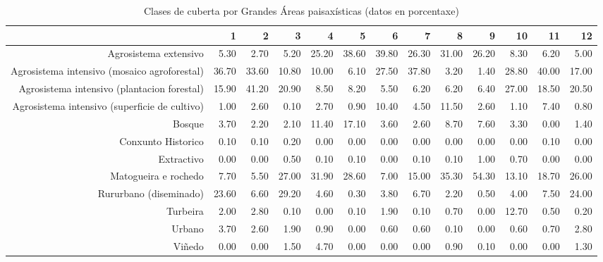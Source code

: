 \begin{table}[p]
\centering
\caption{Clases de cuberta por Grandes Áreas paisaxísticas (datos en porcentaxe)} 
\label{xtaboa2p}
\begin{tabular}{rrrrrrrrrrrrr}
  \hline
 & 1 & 2 & 3 & 4 & 5 & 6 & 7 & 8 & 9 & 10 & 11 & 12 \\ 
  \hline
Agrosistema extensivo & 5.30 & 2.70 & 5.20 & 25.20 & 38.60 & 39.80 & 26.30 & 31.00 & 26.20 & 8.30 & 6.20 & 5.00 \\ 
  Agrosistema intensivo (mosaico agroforestal) & 36.70 & 33.60 & 10.80 & 10.00 & 6.10 & 27.50 & 37.80 & 3.20 & 1.40 & 28.80 & 40.00 & 17.00 \\ 
  Agrosistema intensivo (plantacion forestal) & 15.90 & 41.20 & 20.90 & 8.50 & 8.20 & 5.50 & 6.20 & 6.20 & 6.40 & 27.00 & 18.50 & 20.50 \\ 
  Agrosistema intensivo (superficie de cultivo) & 1.00 & 2.60 & 0.10 & 2.70 & 0.90 & 10.40 & 4.50 & 11.50 & 2.60 & 1.10 & 7.40 & 0.80 \\ 
  Bosque & 3.70 & 2.20 & 2.10 & 11.40 & 17.10 & 3.60 & 2.60 & 8.70 & 7.60 & 3.30 & 0.00 & 1.40 \\ 
  Conxunto Historico & 0.10 & 0.10 & 0.20 & 0.00 & 0.00 & 0.00 & 0.00 & 0.00 & 0.00 & 0.00 & 0.10 & 0.00 \\ 
  Extractivo & 0.00 & 0.00 & 0.50 & 0.10 & 0.10 & 0.00 & 0.10 & 0.10 & 1.00 & 0.70 & 0.00 & 0.00 \\ 
  Matogueira e rochedo & 7.70 & 5.50 & 27.00 & 31.90 & 28.60 & 7.00 & 15.00 & 35.30 & 54.30 & 13.10 & 18.70 & 26.00 \\ 
  Rururbano (diseminado) & 23.60 & 6.60 & 29.20 & 4.60 & 0.30 & 3.80 & 6.70 & 2.20 & 0.50 & 4.00 & 7.50 & 24.00 \\ 
  Turbeira & 2.00 & 2.80 & 0.10 & 0.00 & 0.10 & 1.90 & 0.10 & 0.70 & 0.00 & 12.70 & 0.50 & 0.20 \\ 
  Urbano & 3.70 & 2.60 & 1.90 & 0.90 & 0.00 & 0.60 & 0.60 & 0.10 & 0.00 & 0.60 & 0.70 & 2.80 \\ 
  Viñedo & 0.00 & 0.00 & 1.50 & 4.70 & 0.00 & 0.00 & 0.00 & 0.90 & 0.10 & 0.00 & 0.00 & 1.30 \\ 
   \hline
\end{tabular}
\end{table}
